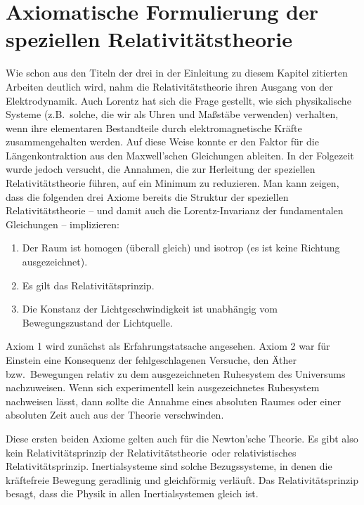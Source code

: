 \section{Axiomatische Formulierung der\\speziellen Relativit\"atstheorie}

Wie schon aus den Titeln der drei in der Einleitung zu diesem
Kapitel zitierten Arbeiten deutlich wird, nahm die Relativit\"atstheorie
ihren Ausgang von der Elektrodynamik. Auch Lorentz hat sich
die Frage gestellt, wie sich physikalische Systeme (z.B.\ solche,
die wir als Uhren und Ma\ss st\"abe verwenden) verhalten, wenn
ihre elementaren Bestandteile durch elektromagnetische
Kr\"afte zusammengehalten werden. Auf diese Weise konnte er
den Faktor f\"ur die L\"angenkontraktion aus den Maxwell'schen
Gleichungen ableiten. In der Folgezeit wurde jedoch versucht,
die Annahmen, die zur Herleitung der speziellen 
Relativit\"atstheorie f\"uhren, auf ein Minimum zu reduzieren. 
Man kann zeigen, dass die folgenden drei Axiome bereits die 
Struktur der speziellen Relativit\"atstheorie -- und damit auch die
Lorentz-Invarianz der fundamentalen Gleichungen -- implizieren:

\begin{enumerate}
\item
Der Raum ist homogen (\"uberall gleich) und isotrop (es ist keine Richtung ausgezeichnet).
\item
Es gilt das Relativit\"atsprinzip.
\item
Die Konstanz der Lichtgeschwindigkeit ist unabh\"angig vom
Bewegungszustand der Lichtquelle.
\end{enumerate}

Axiom 1 wird zun\"achst als Erfahrungstatsache angesehen.
Axiom 2 war f\"ur Einstein eine 
Konsequenz der fehlgeschlagenen Versuche,
den \"Ather bzw.\ Bewegungen relativ zu dem ausgezeichneten Ruhe\-sys\-tem
des Universums nachzuweisen. Wenn sich experimentell kein ausgezeichnetes 
Ruhe\-sys\-tem nachweisen l\"asst, dann sollte die Annahme eines absoluten
Raumes oder einer absoluten Zeit auch aus der Theorie verschwinden.

Diese ersten beiden Axiome gelten auch f\"ur die
Newton'sche Theorie. Es gibt also kein \glqq Relativit\"atsprinzip der
Relativit\"atstheorie\grqq\ oder relativistisches 
Relativit\"ats\-prinzip. 
Inertialsysteme sind solche Bezugssysteme,
in denen die kr\"aftefreie Bewegung geradlinig und gleichf\"ormig
verl\"auft. Das Relativit\"atsprinzip besagt, dass die Physik in allen
Inertialsystemen gleich ist.


